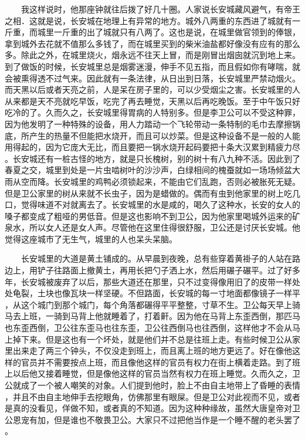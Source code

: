 　　我这样说时，他那座钟就往后拨了好几十圈。人家说长安城藏风避气，有帝王 之相．这就是说，长安城在地理上有异常的地方。城外八两重的东西进了城就有一 斤重，而城里一斤重的出了城就只有八两了。这也是说，在城里做官领到的俸银， 拿到城外去花就不值那么多钱了，而在城里买到的柴米油盐都好像没有应有的那么 多。除此之外，在城里烧火，烟永远不往天上冒，而是刚冒出烟囱就沉到地上来。 到了做饭的时候，长安城里总是烟雾迷漫，伸手不见五指，而且假如你有哮喘，就 会被熏得透不过气来。因此就有一条法律，从日出到日落，长安城里严禁动烟火。 而天黑以后或者天亮之前，人是呆在房子里的，可以少受烟尘之害。长安城里的人 从来都是天不亮就吃早饭，吃完了再去睡觉，天黑以后再吃晚饭。至于中午饭只好 吃冷的了。久而久之，长安城里得胃病的人特别多。但是李卫公可以不受这种罪， 因为他发明了一种特殊的设备，用人力踏动一个飞轮带动一条特制的毛巾去摩擦锅 底，所产生的热量不但能把水烧开，而且可以炒菜。但是这种设备不是一般的人能 用得起的，因为它庞大无比，而且要把一锅水烧开起码要把十条大汉累到精疲力尽 。长安城还有一桩古怪的地方，就是只长槐树，别的树十有八九种不活。因此到了 春夏之交，城里到处是一片虫啮树叶的沙沙声，白绿相间的槐蚕就如一场场倾盆大 雨从空而降。长安城里的鸡鸭必须锁起来，不能由它们乱跑，否则必被胀死无疑。 但是卫公家里的树从来就不长虫子，因为是蜡做的。偶而有虫到他家里的树上吃几 口，觉得味道不对就离去了。长安城里的水是咸的，喝久了这种水，长安的女人的 嗓子都变成了粗哑的男低音。但是这也影响不到卫公，因为他家里喝城外运来的矿 泉水，所以女人还是女人声。尽管他在这里住得很舒服，卫公还是讨厌长安城。他 觉得这座城市了无生气，城里的人也呆头呆脑。

 　　长安城里的大道是黄土铺成的。从早晨到夜晚，总有些穿着黄褂子的人站在路 边上，用铲子往路面上撤黄土，再用长把勺子洒上水，然后用碾子碾平。过了好多 年，长安城被废弃了以后，那些大道还在那里，只不过变得像用旧了的皮带一样处 处龟裂，土块也像瓦块一样坚硬。不但路面，长安城的每一寸地面都像镜子一样平 ，从这个城门到那个城门，每个角落都碾得平平整整，寸草不生。卫公每天早上骑 马去上班，一骑到马背上他就睡着了，打着鼾。因为他在马背上东歪西倒，那匹马 也东歪西倒，卫公往东歪马也往东歪，卫公往西倒马也往西倒，这样他才不会从马 上掉下来。但是这也有一个坏处，就是他们并不总是往班上走。有些时候卫公从家 里出来走了两三个钟头，不仅没走到班上，而且离上班的地方更远了。好在像他这 样的官员并不需要按点上班，而且像他这样的官员有权力在街上横着走路。到了班 上以后他又接着睡觉，但是像他这样的官员当然有权力在班上睡觉。久而久之，卫 公就成了一个被人嘲笑的对象。人们提到他时，脸上不由自主地带上了昏睡的表情 ，并且不由自主地伸手去挖眼角，仿佛那里有眼屎。但是卫公对此视而不见，或者 是真的没看见，佯做不知，或者真的不知道。因为这种种缘故，虽然大唐皇帝对卫 公恩宠有加，但是谁也不敬畏卫公。大家只不过把他当作是一个睡不醒的老头罢了 。


